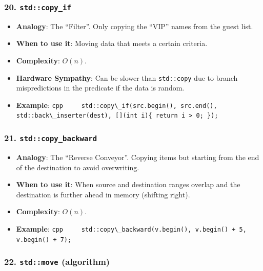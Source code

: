 \hypertarget{stdcopy_if}{%
\subsubsection{\texorpdfstring{20.
\texttt{std::copy\_if}}{20. std::copy\_if}}\label{stdcopy_if}}

\begin{itemize}
\tightlist
\item
  \textbf{Analogy}: The ``Filter''. Only copying the ``VIP'' names from
  the guest list.
\item
  \textbf{When to use it}: Moving data that meets a certain criteria.
\item
  \textbf{Complexity}: \(O(n)\).
\item
  \textbf{Hardware Sympathy}: Can be slower than
  \passthrough{\lstinline!std::copy!} due to branch mispredictions in
  the predicate if the data is random.
\item
  \textbf{Example}:
  \passthrough{\lstinline!cpp     std::copy\_if(src.begin(), src.end(), std::back\_inserter(dest), [](int i)\{ return i > 0; \});!}
\end{itemize}

\hypertarget{stdcopy_backward}{%
\subsubsection{\texorpdfstring{21.
\texttt{std::copy\_backward}}{21. std::copy\_backward}}\label{stdcopy_backward}}

\begin{itemize}
\tightlist
\item
  \textbf{Analogy}: The ``Reverse Conveyor''. Copying items but starting
  from the end of the destination to avoid overwriting.
\item
  \textbf{When to use it}: When source and destination ranges overlap
  and the destination is further ahead in memory (shifting right).
\item
  \textbf{Complexity}: \(O(n)\).
\item
  \textbf{Example}:
  \passthrough{\lstinline!cpp     std::copy\_backward(v.begin(), v.begin() + 5, v.begin() + 7);!}
\end{itemize}

\hypertarget{stdmove-algorithm}{%
\subsubsection{\texorpdfstring{22. \texttt{std::move}
(algorithm)}{22. std::move (algorithm)}}\label{stdmove-algorithm}}

